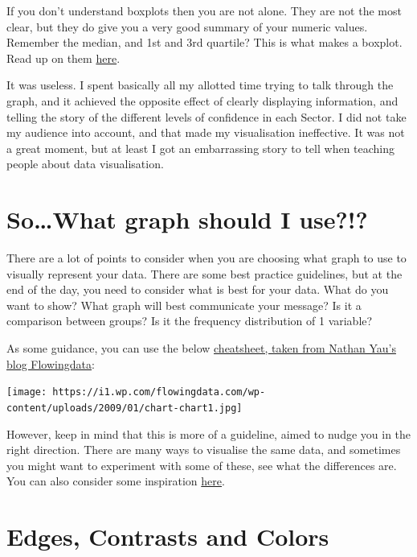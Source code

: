\documentclass[
]{book}
\begin{document}
If you don't understand boxplots then you are not alone. They are not the most clear, but they do give you a very good summary of your numeric values. Remember the median, and 1st and 3rd quartile? This is what makes a boxplot. Read up on them \href{https://en.wikipedia.org/wiki/Box_plot}{here}.

It was useless. I spent basically all my allotted time trying to talk through the graph, and it achieved the opposite effect of clearly displaying information, and telling the story of the different levels of confidence in each Sector. I did not take my audience into account, and that made my visualisation ineffective. It was not a great moment, but at least I got an embarrassing story to tell when teaching people about data visualisation.

\hypertarget{sowhat-graph-should-i-use}{%
\section{So\ldots What graph should I use?!?}\label{sowhat-graph-should-i-use}}

There are a lot of points to consider when you are choosing what graph to use to visually represent your data. There are some best practice guidelines, but at the end of the day, you need to consider what is best for your data. What do you want to show? What graph will best communicate your message? Is it a comparison between groups? Is it the frequency distribution of 1 variable?

As some guidance, you can use the below \href{https://flowingdata.com/2009/01/15/flow-chart-shows-you-what-chart-to-use/}{cheatsheet, taken from Nathan Yau's blog Flowingdata}:

\texttt{[image: https://i1.wp.com/flowingdata.com/wp-content/uploads/2009/01/chart-chart1.jpg]}

However, keep in mind that this is more of a guideline, aimed to nudge you in the right direction. There are many ways to visualise the same data, and sometimes you might want to experiment with some of these, see what the differences are. You can also consider some inspiration \href{http://datavizproject.com/}{here}.

\hypertarget{edges-contrasts-and-colors}{%
\section{Edges, Contrasts and Colors}\label{edges-contrasts-and-colors}}
\end{document}
